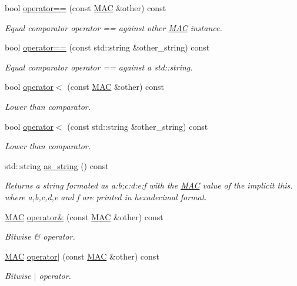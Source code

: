 \begin{DoxyCompactItemize}
bool \hyperlink{structMAC_afb8130f7b3c42662da0530acec672009}{operator==} (const \hyperlink{structMAC}{M\+AC} \&other) const 
\begin{DoxyCompactList}\small\item\em Equal comparator operator == against other \hyperlink{structMAC}{M\+AC} instance. \end{DoxyCompactList}\item 
bool \hyperlink{structMAC_a3258f3f12ea229dce32a912c2d6f02ff}{operator==} (const std\+::string \&other\+\_\+string) const 
\begin{DoxyCompactList}\small\item\em Equal comparator operator == against a std\+::string. \end{DoxyCompactList}\item 
bool \hyperlink{structMAC_a6f58d8e7e0ce6ed738aa633e8357ba29}{operator$<$} (const \hyperlink{structMAC}{M\+AC} \&other) const 
\begin{DoxyCompactList}\small\item\em Lower than comparator. \end{DoxyCompactList}\item 
bool \hyperlink{structMAC_ab292ef694024f72d65bde931e6f41b53}{operator$<$} (const std\+::string \&other\+\_\+string) const 
\begin{DoxyCompactList}\small\item\em Lower than comparator. \end{DoxyCompactList}\item 
std\+::string \hyperlink{structMAC_aa298c6eb1ca7114f8a126e260a40548a}{as\+\_\+string} () const 
\begin{DoxyCompactList}\small\item\em Returns a string formated as \textquotesingle{}a\+:b;c\+:d\+:e\+:f\textquotesingle{} with the \hyperlink{structMAC}{M\+AC} value of the implicit this. where a,b,c,d,e and f are printed in hexadecimal format. \end{DoxyCompactList}\item 
\hyperlink{structMAC}{M\+AC} \hyperlink{structMAC_a7faadff868aa091167276de4bb83f173}{operator\&} (const \hyperlink{structMAC}{M\+AC} \&other) const 
\begin{DoxyCompactList}\small\item\em Bitwise \& operator. \end{DoxyCompactList}\item 
\hyperlink{structMAC}{M\+AC} \hyperlink{structMAC_aa49ae253b26728ec7dd0c434b286a058}{operator$\vert$} (const \hyperlink{structMAC}{M\+AC} \&other) const 
\begin{DoxyCompactList}\small\item\em Bitwise $\vert$ operator. \end{DoxyCompactList}\end{DoxyCompactItemize}
